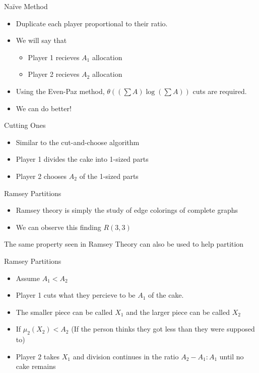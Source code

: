 \documentclass[aspectratio=169,xcolor=dvipsnames]{beamer}
\begin{document}
\begin{frame}{Na{\"i}ve Method}
	\begin{itemize}
		\item Duplicate each player proportional to their ratio.\pause
		\item We will say that 
		\begin{itemize}
			\item Player 1 recieves $A_1$ allocation
			\item Player 2 recieves $A_2$ allocation
		\end{itemize}\pause
		\item Using the Even-Paz method, $\theta((\sum A)\log(\sum A))$ cuts are required.\newline
		\item We can do better!
	\end{itemize}
\end{frame}
\begin{frame}{Cutting Ones}
	\begin{itemize}
		\item Similar to the cut-and-choose algorithm\pause
		\item Player 1 divides the cake into 1-sized parts
		\item Player 2 chooses $A_2$ of the 1-sized parts
	\end{itemize}
\end{frame}
\begin{frame}{Ramsey Partitions}
	\begin{itemize}
		\item Ramsey theory is simply the study of edge colorings of complete graphs\pause
		\item We can observe this finding $R(3, 3)$\pause
	\end{itemize}
	The same property seen in Ramsey Theory can also be used to help partition
\end{frame}
\begin{frame}{Ramsey Partitions}
	\begin{itemize}
		\item Assume $A_1 < A_2$
		\item Player 1 cuts what they percieve to be $A_1$ of the cake.
		\item The smaller piece can be called $X_1$ and the larger piece can be called $X_2$
		\item If $\mu_2(X_2) < A_2$ (If the person thinks they got less than they were supposed to)
		\item Player 2 takes $X_1$ and division continues in the ratio $A_2 - A_1: A_1$ until no cake remains
	\end{itemize}
\end{frame}
\end{document}
